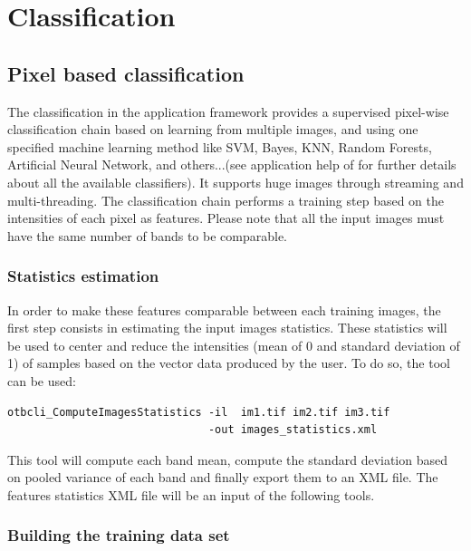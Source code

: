 \section{Classification}\label{sec:classification}

\subsection{Pixel based classification}\label{ssec:pbclassif}

The classification in the application framework provides a supervised pixel-wise
classification chain based on learning from multiple images, and using one 
specified machine learning method like SVM, Bayes, KNN, Random Forests, Artificial 
Neural Network, and others...(see application help of 
 for further details about all the available 
classifiers). It supports huge images through streaming and multi-threading. The 
classification chain performs a training step based on the intensities of each 
pixel as features. Please note that all the input images must have the same number 
of bands to be comparable.

\subsubsection{Statistics estimation}
In order to make these features comparable between each training images, the first 
step consists in estimating the input images statistics. These statistics will be 
used to center and reduce the intensities (mean of 0 and standard deviation of 1) 
of samples based on the vector data produced by the user. To do so, the
 tool can be used:

\begin{verbatim}
otbcli_ComputeImagesStatistics -il  im1.tif im2.tif im3.tif
                               -out images_statistics.xml
\end{verbatim}

This tool will compute each band mean, compute the standard deviation based on
pooled variance of each band and finally export them to an XML file.
The features statistics XML file will be an input of the following tools.

\subsubsection{Building the training data set}\label{sssec:building}

